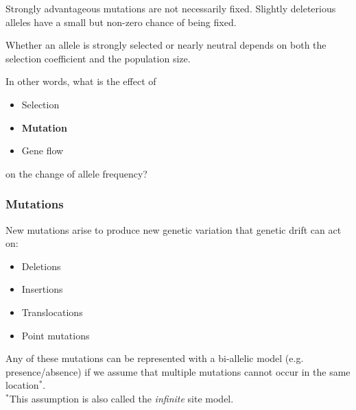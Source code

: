 \documentclass{beamer}
\newcommand{\1}{\ensuremath{\mathbf{1}}}
\begin{document}
%
%
%
\begin{frame}
	\begin{block}{}
		Strongly advantageous mutations are not necessarily fixed. Slightly deleterious alleles have a small but non-zero chance of being fixed.
	\end{block}
	\vspace{2ex}
	\begin{block}{}
		Whether an allele is strongly selected or nearly neutral depends on both the selection coefficient and the population size.
	\end{block}
\end{frame}
%
%
%
\begin{frame}
	In other words, what is the effect of
	\begin{itemize}
		\item Selection
		\item \textbf{Mutation}
		\item Gene flow
	\end{itemize}
	on the change of allele frequency?
\end{frame}
%
%
%
\begin{frame}\frametitle{Mutations}
	New mutations arise to produce new genetic variation that genetic drift can act on:
	\begin{itemize}
		\item Deletions
		\item Insertions
		\item Translocations
		\item Point mutations
	\end{itemize}
	Any of these mutations can be represented with a bi-allelic model (e.g. presence/absence) if we assume that multiple mutations cannot occur in the same location$^{*}$.\\[2ex]
	{\footnotesize $^{*}$This assumption is also called the \emph{infinite} site model.}
\end{frame}
\end{document}
